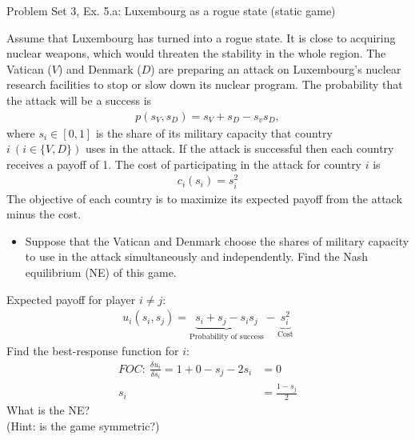 \begin{frame}{Problem Set 3, Ex. 5.a: Luxembourg as a rogue state (static game)}
  \begin{multicols}{2}
    Assume that Luxembourg has turned into a rogue state. It is close to acquiring nuclear weapons, which would threaten the stability in the whole region. The Vatican ($V$) and Denmark ($D$) are preparing an attack on Luxembourg’s nuclear research facilities to stop or slow down its nuclear program. The probability that the attack will be a success is
    \begin{align*}
      p(s_V,s_D)=s_V+s_D-s_vs_D,
    \end{align*}
    where $s_i\in[0,1]$ is the share of its military capacity that country $i\ (i\in\{V,D\})$ uses in the attack. If the attack is successful then each country receives a payoff of 1. The cost of participating in the attack for country $i$ is
    \begin{align*}
      c_i(s_i)=s_i^2
    \end{align*}
    The objective of each country is to maximize its expected payoff from the attack minus the cost.
  \vfill\null\columnbreak
    \begin{itemize}
      \item[(a)] Suppose that the Vatican and Denmark choose the shares of military capacity to use in the attack simultaneously and independently. Find the Nash equilibrium (NE) of this game.
    \end{itemize}
    Expected payoff for player $i\neq j$:
    \begin{align*}
      u_i(s_i,s_j)=\underbrace{s_i+s_j-s_is_j}_\text{Probability of success}-\underbrace{s_i^2}_\text{Cost}
    \end{align*}
    Find the best-response function for $i$:
    \begin{align*}
      FOC:\ \frac{\delta u_i}{\delta s_i}=1+0-s_j-2s_i&=0\\
       s_i&=\frac{1-s_j}{2}
    \end{align*}
    What is the NE?\\\medskip
    (Hint: is the game symmetric?)
  \vfill\null
  \end{multicols}
\end{frame}
